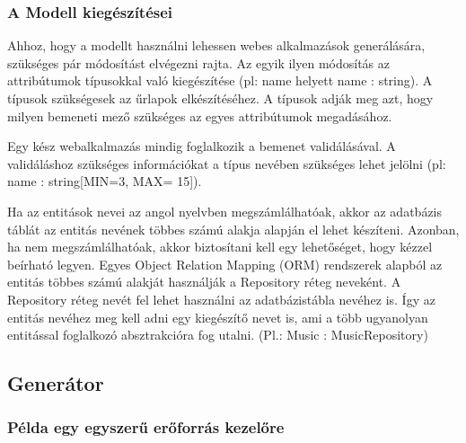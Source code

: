 \documentclass[a4paper,12pt,oneside]{report}
\begin{document}
\newpage
\subsubsection{A Modell kiegészítései }

\begin{justify}

	Ahhoz, hogy a modellt használni lehessen webes alkalmazások generálására, szükséges pár módosítást elvégezni rajta. Az egyik ilyen módosítás az attribútumok típusokkal való kiegészítése (pl: name helyett name : string). A típusok szükségesek az űrlapok elkészítéséhez. A típusok adják meg azt, hogy milyen bemeneti mező szükséges az egyes attribútumok megadásához.

	Egy kész webalkalmazás mindig foglalkozik a bemenet validálásával. A validáláshoz szükséges információkat a típus nevében szükséges lehet jelölni (pl: name : string[MIN=3, MAX= 15]).

	Ha az entitások nevei az angol nyelvben megszámlálhatóak, akkor az adatbázis táblát az entitás nevének többes számú alakja alapján el lehet készíteni. Azonban, ha nem megszámlálhatóak, akkor biztosítani kell egy lehetőséget, hogy kézzel beírható legyen. Egyes Object Relation Mapping (ORM) rendszerek alapból az entitás többes számú alakját használják a Repository réteg neveként. A Repository réteg nevét fel lehet használni az adatbázistábla nevéhez is. Így az entitás nevéhez meg kell adni egy kiegészítő nevet is, ami a több ugyanolyan entitással foglalkozó absztrakcióra fog utalni. (Pl.: Music : MusicRepository)

\end{justify}

\newpage
\subsection{Generátor}
\subsubsection{Példa egy egyszerű erőforrás kezelőre}
\end{document}
